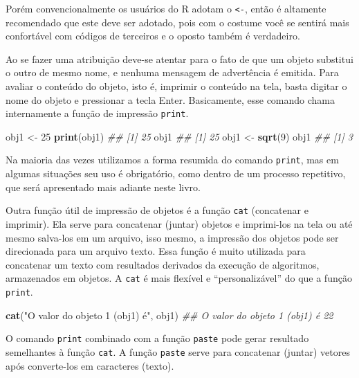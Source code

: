 \documentclass[
  11pt,
  a5paper,
  openany]{book}
\newenvironment{Shaded}{\begin{snugshade}}{\end{snugshade}}
\newcommand{\CommentTok}[1]{\textcolor[rgb]{0.56,0.35,0.01}{\textit{#1}}}
\newcommand{\DecValTok}[1]{\textcolor[rgb]{0.00,0.00,0.81}{#1}}
\newcommand{\KeywordTok}[1]{\textcolor[rgb]{0.13,0.29,0.53}{\textbf{#1}}}
\newcommand{\NormalTok}[1]{#1}
\newcommand{\StringTok}[1]{\textcolor[rgb]{0.31,0.60,0.02}{#1}}
\begin{document}
Porém convencionalmente os usuários do R adotam o \texttt{\textless{}-}, então é altamente recomendado que este deve ser adotado, pois com o costume você se sentirá mais confortável com códigos de terceiros e o oposto também é verdadeiro.

Ao se fazer uma atribuição deve-se atentar para o fato de que um objeto substitui o outro de mesmo nome, e nenhuma mensagem de advertência é emitida. Para avaliar o conteúdo do objeto, isto é, imprimir o conteúdo na tela, basta digitar o nome do objeto e pressionar a tecla Enter. Basicamente, esse comando chama internamente a função de impressão \texttt{print}.

\begin{Shaded}
\begin{Highlighting}[]
\NormalTok{obj1 <-}\StringTok{ }\DecValTok{25}
\KeywordTok{print}\NormalTok{(obj1)}
\CommentTok{## [1] 25}
\NormalTok{obj1}
\CommentTok{## [1] 25}
\NormalTok{obj1 <-}\StringTok{ }\KeywordTok{sqrt}\NormalTok{(}\DecValTok{9}\NormalTok{)}
\NormalTok{obj1}
\CommentTok{## [1] 3}
\end{Highlighting}
\end{Shaded}

Na maioria das vezes utilizamos a forma resumida do comando \texttt{print}, mas em algumas situações seu uso é obrigatório, como dentro de um processo repetitivo, que será apresentado mais adiante neste livro.

Outra função útil de impressão de objetos é a função \texttt{cat} (concatenar e imprimir). Ela serve para concatenar (juntar) objetos e imprimi-los na tela ou até mesmo salva-los em um arquivo, isso mesmo, a impressão dos objetos pode ser direcionada para um arquivo texto. Essa função é muito utilizada para concatenar um texto com resultados derivados da execução de algoritmos, armazenados em objetos. A \texttt{cat} é mais flexível e ``personalizável'' do que a função \texttt{print}.

\begin{Shaded}
\begin{Highlighting}[]
\KeywordTok{cat}\NormalTok{(}\StringTok{"O valor do objeto 1 (obj1) é"}\NormalTok{, obj1)}
\CommentTok{## O valor do objeto 1 (obj1) é 22}
\end{Highlighting}
\end{Shaded}

O comando \texttt{print} combinado com a função \texttt{paste} pode gerar resultado semelhantes à função \texttt{cat}. A função \texttt{paste} serve para concatenar (juntar) vetores após converte-los em caracteres (texto).
\end{document}
